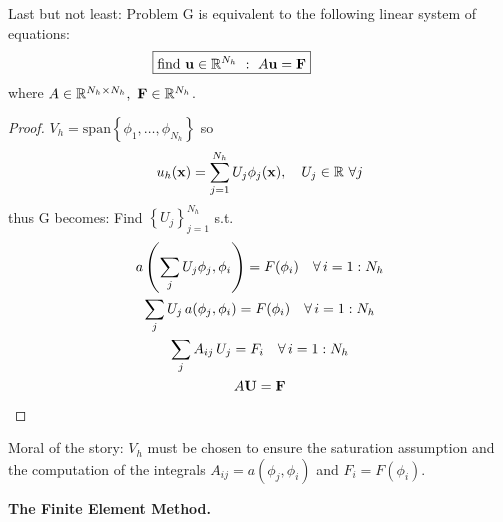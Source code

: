 Last but not least: Problem G is equivalent to the following linear system of equations:
\begin{equation*}
\boxed{\text{find } \mathbf{u}\in\mathbb{R}^{N_h}\ :\ A\mathbf{u}=\mathbf{F}}\qquad\qquad
\end{equation*}
where $A\in\RR^{N_h\times N_h},\ \Fv\in\RR^{N_h}$.

\begin{proof}
$V_h=\text{span}\left\{ \phi_1,\dots,\phi_{N_h} \right\}$ so
\begin{equation*}
u_h(\mathbf{x})=\sum_{j=1}^{N_h} U_j \phi_j(\mathbf{x}),\quad U_j\in\mathbb{R}\ \forall j
\end{equation*}
thus G becomes: Find $\left\{ U_j \right\}_{j=1}^{N_h}$ s.t.
\begin{gather*}
a\left( \sum_j U_j\phi_j,\phi_i \right)=F( \phi_i )\quad\forall\, i=1:N_h \\
\sum_j U_j\, a(\phi_j,\phi_i) = F(\phi_i)\quad\forall\, i=1:N_h \\
\sum_j A_{ij}\,U_j=F_i\quad\forall\, i=1:N_h \\
A\mathbf{U}=\mathbf{F}
\end{gather*}
\end{proof}

Moral of the story: $V_h$ must be chosen to ensure the saturation assumption and the computation of the integrals $A_{ij}=a(\phi_j,\phi_i)$ and $F_i=F(\phi_i)$.

\medskip

\textbf{The Finite Element Method.}

\bigskip

\bigskip

\bigskip

\bigskip

\bigskip

\bigskip

\bigskip

\bigskip

\bigskip

\bigskip

\bigskip

\bigskip

\bigskip

\bigskip


\bigskip

\bigskip

\bigskip

\bigskip

\bigskip

\bigskip

\bigskip

